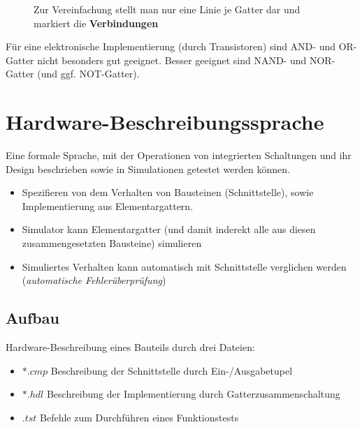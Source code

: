 \documentclass[12pt]{report}
\begin{document}
\begin{figure}[h]
\begin{minipage}[t]{0.45\textwidth}
    Zur Vereinfachung stellt man nur eine Linie je Gatter dar und markiert die \textbf{Verbindungen}
  \end{minipage}
\end{figure}

Für eine elektronische Implementierung (durch Transistoren) sind AND- und OR-Gatter nicht besonders gut geeignet.
Besser geeignet sind NAND- und NOR-Gatter (und ggf. NOT-Gatter).


\section{Hardware-Beschreibungssprache}
\begin{defbox}
  Eine formale Sprache, mit der Operationen von integrierten Schaltungen und ihr Design beschrieben sowie in Simulationen getestet werden können.
  \begin{itemize}
    \item Spezifieren von dem Verhalten von Bausteinen (Schnittstelle), sowie Implementierung aus Elementargattern.
    \item Simulator kann Elementargatter (und damit inderekt alle aus diesen zusammengesetzten Bausteine) simulieren
    \item Simuliertes Verhalten kann automatisch mit Schnittstelle verglichen werden (\textit{automatische Fehlerüberprüfung})
  \end{itemize}
\end{defbox}

\subsection{Aufbau}
Hardware-Beschreibung eines Bauteils durch drei Dateien:
\begin{itemize}
  \item $*.cmp$ Beschreibung der Schnittstelle durch Ein-/Ausgabetupel
  \item $*.hdl$ Beschreibung der Implementierung durch Gatterzusammenschaltung
  \item $.tst$ Befehle zum Durchführen eines Funktionstests
\end{itemize}



\end{document}
